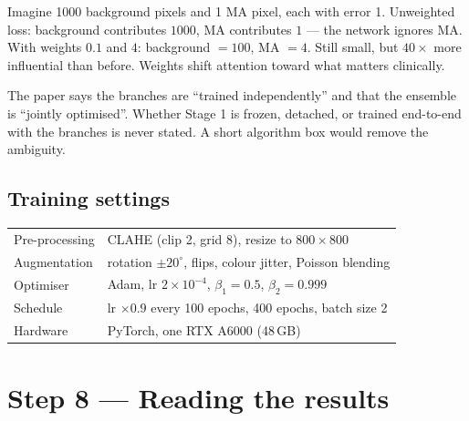 \documentclass[11pt,a4paper]{article}
\begin{document}
\begin{worked}
Imagine 1000 background pixels and 1 MA pixel, each with error 1. Unweighted loss: background
contributes $1000$, MA contributes $1$ --- the network ignores MA. With weights $0.1$ and $4$:
background $=100$, MA $=4$. Still small, but $40\times$ more influential than before. Weights shift
attention toward what matters clinically.
\end{worked}

\begin{careful}
The paper says the branches are ``trained independently'' and that the ensemble is ``jointly
optimised''. Whether Stage 1 is frozen, detached, or trained end-to-end with the branches is never
stated. A short algorithm box would remove the ambiguity.
\end{careful}

\subsection*{Training settings}
\begin{center}
\small
\begin{tabular}{@{}ll@{}}
\toprule
Pre-processing & CLAHE (clip 2, grid 8), resize to $800\times800$\\
Augmentation & rotation $\pm20^\circ$, flips, colour jitter, Poisson blending\\
Optimiser & Adam, lr $2\times10^{-4}$, $\beta_1=0.5$, $\beta_2=0.999$\\
Schedule & lr $\times0.9$ every 100 epochs, 400 epochs, batch size 2\\
Hardware & PyTorch, one RTX A6000 (48\,GB)\\
\bottomrule
\end{tabular}
\end{center}

\section{Step 8 --- Reading the results}
\end{document}
